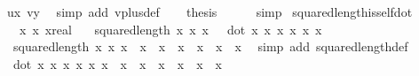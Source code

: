 \begin{isabellebody}
\ ux\ vy\ \isamarkupfalse%
\ {\isacharparenleft}{\kern0pt}simp\ add{\isacharcolon}{\kern0pt}\ vplus{\isacharunderscore}{\kern0pt}def{\isacharparenright}{\kern0pt}\isanewline
\ \ \isamarkupfalse%
\ {\isacharquery}{\kern0pt}thesis\ \isamarkupfalse%
\ {}\ {}\ \isamarkupfalse%
\ simp\isanewline
{}\isamarkupfalse%
%
\endisatagproof
{\isafoldproof}%
%
\isadelimproof
\isanewline
%
\endisadelimproof
\isanewline
{}\isamarkupfalse%
\ squared{\isacharunderscore}{\kern0pt}length{\isacharunderscore}{\kern0pt}is{\isacharunderscore}{\kern0pt}self{\isacharunderscore}{\kern0pt}dot{\isacharcolon}{\kern0pt}\isanewline
\ \ \ x{}\ x{}\ x{}{\isacharcolon}{\kern0pt}{\isacharcolon}{\kern0pt}real\isanewline
\ \ \ {\isachardoublequoteopen}squared{\isacharunderscore}{\kern0pt}length\ {\isacharparenleft}{\kern0pt}x{}{\isacharcomma}{\kern0pt}\ x{}{\isacharcomma}{\kern0pt}\ x{}{\isacharparenright}{\kern0pt}\ \ {\isacharequal}{\kern0pt}\ dot\ {\isacharparenleft}{\kern0pt}x{}{\isacharcomma}{\kern0pt}\ x{}{\isacharcomma}{\kern0pt}\ x{}{\isacharparenright}{\kern0pt}\ {\isacharparenleft}{\kern0pt}x{}{\isacharcomma}{\kern0pt}\ x{}{\isacharcomma}{\kern0pt}\ x{}{\isacharparenright}{\kern0pt}{\isachardoublequoteclose}\isanewline
%
\isadelimproof
%
\endisadelimproof
%
\isatagproof
{}\isamarkupfalse%
\ {\isacharminus}{\kern0pt}\isanewline
\ \ \isamarkupfalse%
\ {}{\isacharcolon}{\kern0pt}\ {\isachardoublequoteopen}{\isacharparenleft}{\kern0pt}squared{\isacharunderscore}{\kern0pt}length\ {\isacharparenleft}{\kern0pt}x{}{\isacharcomma}{\kern0pt}\ x{}{\isacharcomma}{\kern0pt}\ x{}{\isacharparenright}{\kern0pt}{\isacharparenright}{\kern0pt}\ {\isacharequal}{\kern0pt}\ x{}\ {\isacharasterisk}{\kern0pt}\ x{}\ {\isacharplus}{\kern0pt}\ x{}\ {\isacharasterisk}{\kern0pt}\ x{}\ {\isacharplus}{\kern0pt}\ x{}\ {\isacharasterisk}{\kern0pt}\ x{}{\isachardoublequoteclose}\ \isamarkupfalse%
\ {\isacharparenleft}{\kern0pt}simp\ add{\isacharcolon}{\kern0pt}\ squared{\isacharunderscore}{\kern0pt}length{\isacharunderscore}{\kern0pt}def{\isacharparenright}{\kern0pt}\isanewline
\ \ \isamarkupfalse%
\ {}{\isacharcolon}{\kern0pt}\ {\isachardoublequoteopen}dot\ {\isacharparenleft}{\kern0pt}x{}{\isacharcomma}{\kern0pt}\ x{}{\isacharcomma}{\kern0pt}\ x{}{\isacharparenright}{\kern0pt}\ {\isacharparenleft}{\kern0pt}x{}{\isacharcomma}{\kern0pt}\ x{}{\isacharcomma}{\kern0pt}\ x{}{\isacharparenright}{\kern0pt}\ {\isacharequal}{\kern0pt}\ x{}\ {\isacharasterisk}{\kern0pt}\ x{}\ {\isacharplus}{\kern0pt}\ x{}\ {\isacharasterisk}{\kern0pt}\ x{}\ {\isacharplus}{\kern0pt}\ x{}\ {\isacharasterisk}{\kern0pt}\ x{}{\isachardoublequoteclose}\ \isamarkupfalse%

\end{isabellebody}
